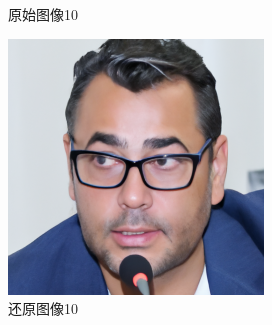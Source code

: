 \begin{figure}[H]
\begin{minipage}[b]{0.3\linewidth}
    \caption{原始图像10}
    \label{original image }
  \end{minipage}
\hspace{0.1cm}
  \begin{minipage}[b]{0.3\linewidth}
    \includegraphics[width=\linewidth]{Picture/recon/00005.png}
    \caption{还原图像10}
    \label{inpainted image}
  \end{minipage}
\end{figure}

